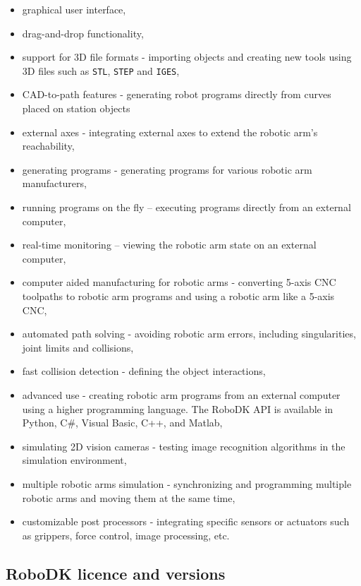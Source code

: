 \begin{itemize}
\item graphical user interface,
\item drag-and-drop functionality, 
\item support for 3D file formats - importing objects and creating new tools using 3D files such as \texttt{STL}, \texttt{STEP} and \texttt{IGES},
\item CAD-to-path features - generating robot programs directly from curves placed on station objects 
\item external axes - integrating external axes to extend the robotic arm’s reachability,
\item generating programs - generating programs for various robotic arm manufacturers,
\item running programs on the fly – executing programs directly from an external computer,
\item real-time monitoring – viewing the robotic arm state on an external computer,
\item computer aided manufacturing for robotic arms - converting 5-axis CNC toolpaths to robotic arm programs and using a robotic arm like a 5-axis CNC,
\item automated path solving - avoiding robotic arm errors, including singularities, joint limits and collisions,
\item fast collision detection - defining the object interactions, 
\item advanced use - creating robotic arm programs from an external computer using a higher programming language. The RoboDK API is available in Python, C\#, Visual Basic, C++, and Matlab,
\item simulating 2D vision cameras - testing image recognition algorithms in the simulation environment,
\item multiple robotic arms simulation - synchronizing and programming multiple robotic arms and moving them at the same time, 
\item customizable post processors - integrating specific sensors or actuators such as grippers, force control, image processing, etc.
\end{itemize}

\subsection{RoboDK licence and versions}

